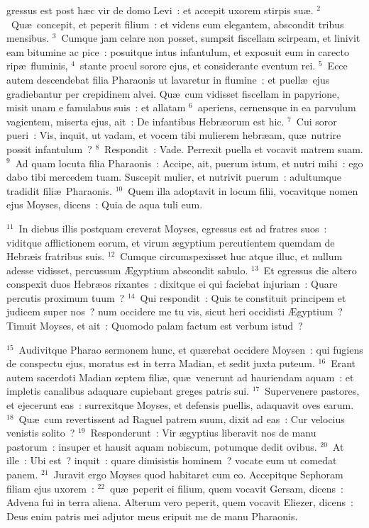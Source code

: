 \bchapter
{}gressus est post h\ae c vir de domo Levi~: et accepit uxorem stirpis su\ae .
${}^{2}$~Qu\ae\ concepit, et peperit filium~: et videns eum elegantem, abscondit tribus mensibus.
${}^{3}$~Cumque jam celare non posset, sumpsit fiscellam scirpeam, et linivit eam bitumine ac pice~: posuitque intus infantulum, et exposuit eum in carecto rip\ae\ fluminis,
${}^{4}$~stante procul sorore ejus, et considerante eventum rei.
${}^{5}$~Ecce autem descendebat filia Pharaonis ut lavaretur in flumine~: et puell\ae\ ejus gradiebantur per crepidinem alvei. Qu\ae\ cum vidisset fiscellam in papyrione, misit unam e famulabus suis~: et allatam
${}^{6}$~aperiens, cernensque in ea parvulum vagientem, miserta ejus, ait~: De infantibus Hebr\ae orum est hic.
${}^{7}$~Cui soror pueri~: Vis, inquit, ut vadam, et vocem tibi mulierem hebr\ae am, qu\ae\ nutrire possit infantulum~?
${}^{8}$~Respondit~: Vade. Perrexit puella et vocavit matrem suam.
${}^{9}$~Ad quam locuta filia Pharaonis~: Accipe, ait, puerum istum, et nutri mihi~: ego dabo tibi mercedem tuam. Suscepit mulier, et nutrivit puerum~: adultumque tradidit fili\ae\ Pharaonis.
${}^{10}$~Quem illa adoptavit in locum filii, vocavitque nomen ejus Moyses, dicens~: Quia de aqua tuli eum.


${}^{11}$~In diebus illis postquam creverat Moyses, egressus est ad fratres suos~: viditque afflictionem eorum, et virum \ae gyptium percutientem quemdam de Hebr\ae is fratribus suis.
${}^{12}$~Cumque circumspexisset huc atque illuc, et nullum adesse vidisset, percussum \AE gyptium abscondit sabulo.
${}^{13}$~Et egressus die altero conspexit duos Hebr\ae os rixantes~: dixitque ei qui faciebat injuriam~: Quare percutis proximum tuum~?
${}^{14}$~Qui respondit~: Quis te constituit principem et judicem super nos~? num occidere me tu vis, sicut heri occidisti \AE gyptium~? Timuit Moyses, et ait~: Quomodo palam factum est verbum istud~?


${}^{15}$~Audivitque Pharao sermonem hunc, et qu\ae rebat occidere Moysen~: qui fugiens de conspectu ejus, moratus est in terra Madian, et sedit juxta puteum.
${}^{16}$~Erant autem sacerdoti Madian septem fili\ae , qu\ae\ venerunt ad hauriendam aquam~: et impletis canalibus adaquare cupiebant greges patris sui.
${}^{17}$~Supervenere pastores, et ejecerunt eas~: surrexitque Moyses, et defensis puellis, adaquavit oves earum.
${}^{18}$~Qu\ae\ cum revertissent ad Raguel patrem suum, dixit ad eas~: Cur velocius venistis solito~?
${}^{19}$~Responderunt~: Vir \ae gyptius liberavit nos de manu pastorum~: insuper et hausit aquam nobiscum, potumque dedit ovibus.
${}^{20}$~At ille~: Ubi est~? inquit~: quare dimisistis hominem~? vocate eum ut comedat panem.
${}^{21}$~Juravit ergo Moyses quod habitaret cum eo. Accepitque Sephoram filiam ejus uxorem~:
${}^{22}$~qu\ae\ peperit ei filium, quem vocavit Gersam, dicens~: Advena fui in terra aliena. Alterum vero peperit, quem vocavit Eliezer, dicens~: Deus enim patris mei adjutor meus eripuit me de manu Pharaonis.


